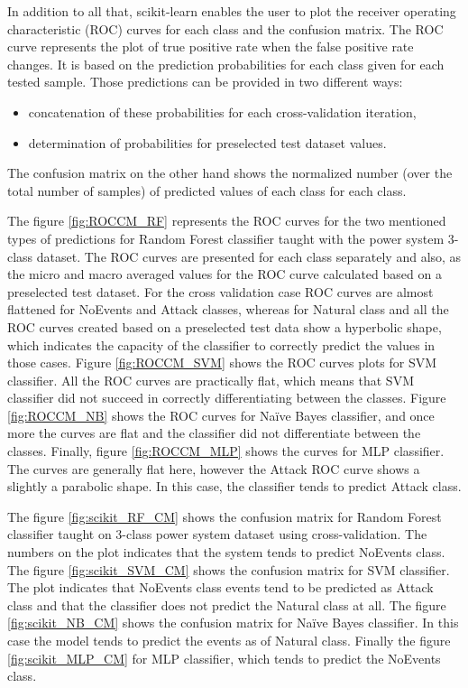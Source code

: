In addition to all that, scikit-learn enables the user to plot the receiver operating characteristic (ROC) curves for each class and the confusion matrix. The ROC curve represents the plot of true positive rate when the false positive rate changes. It is based on the prediction probabilities for each class given for each tested sample. Those predictions can be provided in two different ways:
\begin{itemize}
    \item concatenation of these probabilities for each cross-validation iteration,
    \item determination of probabilities for preselected test dataset values.
\end{itemize} 
The confusion matrix on the other hand shows the normalized number (over the total number of samples) of predicted values of each class for each class. 

The figure \ref{fig:ROCCM_RF} represents the ROC curves for the two mentioned types of predictions for Random Forest classifier taught with the power system 3-class dataset. The ROC curves are presented for each class separately and also, as the micro and macro averaged values for the ROC curve calculated based on a preselected test dataset. For the cross validation case ROC curves are almost flattened for NoEvents and Attack classes, whereas for Natural class and all the ROC curves created based on a preselected test data show a hyperbolic shape, which indicates the capacity of the classifier to correctly predict the values in those cases. Figure \ref{fig:ROCCM_SVM} shows the ROC curves plots for SVM classifier. All the ROC curves are practically flat, which means that SVM classifier did not succeed in correctly differentiating between the classes. Figure \ref{fig:ROCCM_NB} shows the ROC curves for Naïve Bayes classifier, and once more the curves are flat and the classifier did not differentiate between the classes. Finally, figure \ref{fig:ROCCM_MLP} shows the curves for MLP classifier. The curves are generally flat here, however the Attack ROC curve shows a slightly a parabolic shape. In this case, the classifier tends to predict Attack class.


The figure \ref{fig:scikit_RF_CM} shows the confusion matrix for Random Forest classifier taught on 3-class power system dataset using cross-validation. The numbers on the plot indicates that the system tends to predict NoEvents class. The figure \ref{fig:scikit_SVM_CM} shows the confusion matrix for SVM classifier. The plot indicates that NoEvents class events tend to be predicted as Attack class and that the classifier does not predict the Natural class at all. The figure \ref{fig:scikit_NB_CM} shows the confusion matrix for Naïve Bayes classifier. In this case the model tends to predict the events as of Natural class. Finally the figure \ref{fig:scikit_MLP_CM} for MLP classifier, which tends to predict the NoEvents class.

